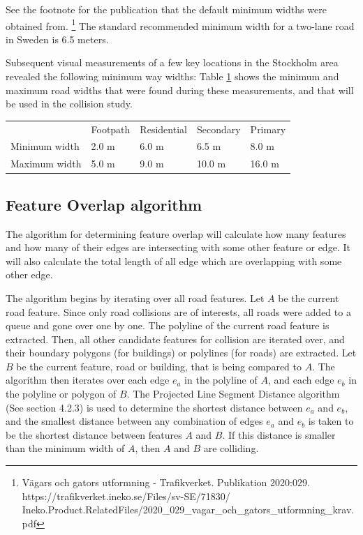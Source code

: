 \documentclass{kththesis}
\begin{document}
See the footnote for the publication that the default minimum widths were obtained from. \footnote{Vägars och gators utformning - Trafikverket. Publikation 2020:029. https://trafikverket.ineko.se/Files/sv-SE/71830/\\Ineko.Product.RelatedFiles/2020\_029\_vagar\_och\_gators\_utformning\_krav.pdf}
The standard recommended minimum width for a two-lane road in Sweden is 6.5 meters.

Subsequent visual measurements of a few key locations in the Stockholm area revealed the following minimum way widths:
Table \ref{table:road-widths} shows the minimum and maximum road widths that were found during these measurements, and that will be used in the collision study.

\begin{table}[H]
    \begin{tabular}{lllll}
                      & Footpath & Residential & Secondary & Primary \\
        Minimum width & 2.0 m    & 6.0 m       & 6.5 m     & 8.0 m   \\
        Maximum width & 5.0 m    & 9.0 m       & 10.0 m    & 16.0 m
    \end{tabular}
    \label{table:road-widths}
\end{table}

\subsection{Feature Overlap algorithm}

The algorithm for determining feature overlap will calculate how many features and how many of their edges are intersecting with some other feature or edge.
It will also calculate the total length of all edge which are overlapping with some other edge.

The algorithm begins by iterating over all road features.
Let $A$ be the current road feature.
Since only road collisions are of interests, all roads were added to a queue and gone over one by one.
The polyline of the current road feature is extracted.
Then, all other candidate features for collision are iterated over, and their boundary polygons (for buildings) or polylines (for roads) are extracted.
Let $B$ be the current feature, road or building, that is being compared to $A$.
The algorithm then iterates over each edge $e_a$ in the polyline of $A$, and each edge $e_b$ in the polyline or polygon of $B$.
The Projected Line Segment Distance algorithm (See section 4.2.3) is used to determine the shortest distance between $e_a$ and $e_b$, and the smallest distance between any combination of edges $e_a$ and $e_b$ is taken to be the shortest distance between features $A$ and $B$.
If this distance is smaller than the minimum width of $A$, then $A$ and $B$ are colliding.
\end{document}
